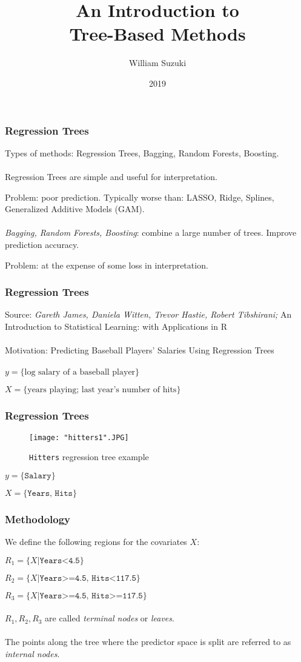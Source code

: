 \documentclass{beamer}
\title{ An Introduction to \\ Tree-Based Methods}
\author{\small William  Suzuki}
\institute{FEARP-USP}
\date{2019}
\begin{document}
 
\frame{\titlepage}
 



\begin{frame}
\frametitle{Regression Trees}
Types of methods: Regression Trees, Bagging, Random Forests, Boosting.
\\~\\
Regression Trees are simple and useful for interpretation. 

Problem: poor prediction. 
Typically worse than: LASSO, Ridge, Splines, Generalized Additive Models (GAM).
\\~\\
\textit{Bagging, Random Forests, Boosting}: combine a large number of trees. Improve prediction accuracy. 

Problem: at the expense of some loss in interpretation.
\end{frame} 





\begin{frame}
\frametitle{Regression Trees}
Source: \textit{Gareth James, Daniela Witten, Trevor Hastie, Robert Tibshirani;} An Introduction to Statistical Learning: with Applications in R
\\~\\

Motivation: Predicting Baseball Players’ Salaries Using Regression Trees
\\~\\
$ y= \{ \text{log salary of a baseball player}  \} $

$ X = \{ \text{years playing;  last year's number of hits} \}  $
\end{frame} 

\begin{frame}
\frametitle{Regression Trees}
\begin{figure}[H]
\caption{\texttt{Hitters} regression tree example}
\texttt{[image: "hitters1".JPG]} 
\end{figure}

$ y= \{ \texttt{Salary}  \} $

$ X = \{ \texttt{Years, Hits} \}  $
\end{frame} 



\begin{frame}
\frametitle{Methodology}

We define the following regions for the covariates $X$:

$ R_1 = \{X| \texttt{Years<4.5}  \}$ 

$ R_2 = \{X| \texttt{Years>=4.5, Hits<117.5} \}$  

$ R_3 = \{X| \texttt{Years>=4.5, Hits>=117.5} \} $
\\~\\
$ R_1, R_2, R_3 $ are called \textit{terminal nodes} or \textit{leaves}.
\\~\\
The points along the tree where the predictor space is split are referred to as \textit{internal nodes}. 
\end{frame} 
\end{document}
